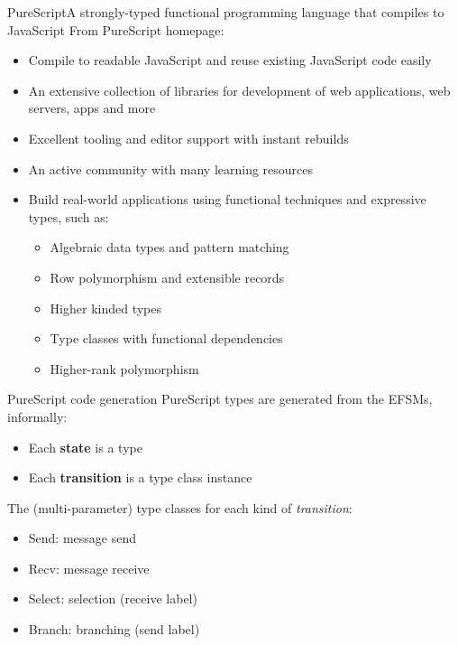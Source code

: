\documentclass[aspectratio=1610]{beamer}
\begin{document}
\begin{frame}{PureScript}{A strongly-typed functional programming language that compiles to JavaScript}
  From PureScript homepage:
  \begin{itemize}
    \item \alert<2>{Compile to readable JavaScript} and reuse existing JavaScript code easily
    \item An extensive collection of libraries for development of web applications, web servers, apps and more
    \item Excellent tooling and editor support with instant rebuilds
    \item An active community with many learning resources
    \item Build real-world applications using functional techniques and expressive types, such as:
      \begin{itemize}
        \item Algebraic data types and pattern matching
        \item Row polymorphism and extensible records
        \item Higher kinded types
        \item \alert<2>{Type classes with functional dependencies}
        \item Higher-rank polymorphism
      \end{itemize}
  \end{itemize}
\end{frame}

\begin{frame}{PureScript code generation}
  PureScript types are generated from the EFSMs, informally:
  \begin{itemize}
    \item Each \textbf{state} is a type
    \item Each \textbf{transition} is a type class instance
  \end{itemize}

  The (multi-parameter) type classes for each kind of \textit{transition}:
  \begin{itemize}
    \item Send: message send
    \item Recv: message receive
    \item Select: selection (receive label)
    \item Branch: branching (send label)
  \end{itemize}
\end{frame}
\end{document}
